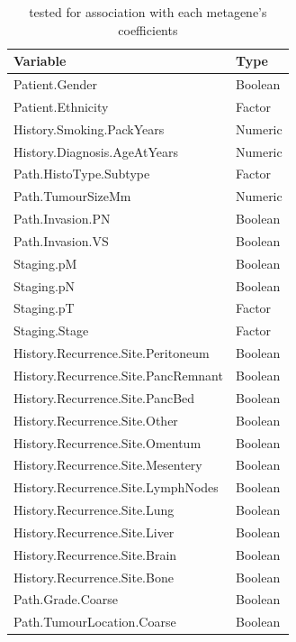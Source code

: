 \documentclass[dissertation.tex]{subfiles}
\begin{document}
\begin{table}
\caption{ tested for association with each metagene's coefficients}
\begin{tabular}{ l l }
  \hline
  Variable & Type \\
  \hline
  Patient.Gender & Boolean \\
  Patient.Ethnicity & Factor \\
  History.Smoking.PackYears & Numeric \\
  History.Diagnosis.AgeAtYears & Numeric \\
  Path.HistoType.Subtype & Factor \\
  Path.TumourSizeMm & Numeric \\ 
  Path.Invasion.PN & Boolean \\
  Path.Invasion.VS & Boolean \\
  Staging.pM & Boolean \\
  Staging.pN & Boolean \\
  Staging.pT & Factor \\
  Staging.Stage & Factor \\
  History.Recurrence.Site.Peritoneum & Boolean \\
  History.Recurrence.Site.PancRemnant & Boolean \\
  History.Recurrence.Site.PancBed & Boolean \\
  History.Recurrence.Site.Other & Boolean \\
  History.Recurrence.Site.Omentum & Boolean \\
  History.Recurrence.Site.Mesentery & Boolean \\
  History.Recurrence.Site.LymphNodes & Boolean \\
  History.Recurrence.Site.Lung & Boolean \\
  History.Recurrence.Site.Liver & Boolean \\
  History.Recurrence.Site.Brain & Boolean \\
  History.Recurrence.Site.Bone & Boolean \\
  Path.Grade.Coarse & Boolean \\
  Path.TumourLocation.Coarse & Boolean \\
  \hline
\end{tabular}
\label{tab:sigs-clinvar-table}
\end{table}
\end{document}
